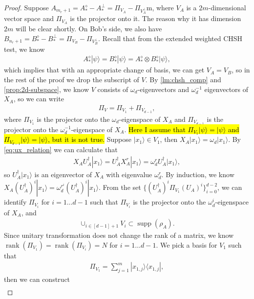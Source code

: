 \documentclass[11pt,letterpaper]{article}
\newcommand{\ket}[1]{|#1\rangle}
\newcommand{\ketbra}[2]{|#1\rangle\langle#2|}
\newcommand{\x}{\otimes}
\DeclareMathOperator{\rank}{rank}
\DeclareMathOperator{\supp}{supp}
\newcommand{\1}{\mathbb{1}}
\theoremstyle{definition}
\begin{document}
\begin{proof}
Suppose $A_{m_r+1} = A_\ast^\diamond- A_\ast^\perp = \Pi_{V_A} - \Pi_{V_A^\perp}$m, where $V_A$ is a
$2m$-dimensional vector space and $\Pi_{V_A}$ is the projector onto it. The reason why it has dimension $2m$
will be clear shortly. On Bob's side, we also have $B_{n_r+1} = B_\ast^\diamond- B_\ast^\perp = \Pi_{V_B} - \Pi_{V_B^\perp}$.
Recall that from the extended weighted CHSH test, we know
\begin{align}
	A_\ast^\diamond \ket{\psi} = B_\ast^\diamond \ket{\psi} = A_\ast^\diamond \x B_\ast^\diamond \ket{\psi},
\end{align}
which implies that with an appropriate change of basis, we can get $V_A = V_B$, so in the rest of the proof
we drop the subscript of $V$.
By \cref{lm:chsh_comp} and \cref{prop:2d-subspace}, we know $V$ consists of $\omega_d$-eigenvectors and $\omega_d^{-1}$ eigenvectors of 
$X_A$, so we can write 
\begin{align}
	\Pi_{V} = \Pi_{V_1} + \Pi_{V_{d-1}},
\end{align}
where $\Pi_{V_{1}}$ is the projector onto the $\omega_d$-eigenspace of $X_A$ and $\Pi_{V_{d-1}}$ is the projector 
onto the $\omega_d^{-1}$-eigenspace of $X_A$.
\hl{Here I assume that $\Pi_{V_1} \ket{\psi} = \ket{\psi}$ and $\Pi_{V_{d-1}} \ket{\psi} = \ket{\psi}$,
but it is not true.}
Suppose $\ket{x_{1}} \in V_{1}$, then $X_A \ket{x_{1}} = \omega_d \ket{x_{1}}$.
By \cref{eq:ux_relation} we can calculate that
\begin{align}
\label{eq:ladder}
 X_AU_A^\dagger \ket{x_{1}} = U_A^\dagger X_A^r \ket{x_{1}} = \omega_d^r U_A^\dagger \ket{x_{1}},
\end{align}
so $U_A^\dagger \ket{x_{1}}$ is an eigenvector of $X_A$ with eigenvalue $\omega_d^r$.
By induction, we know $X_A (U_A^\dagger)^i \ket{x_{1}} = \omega_d^{r^i} (U_A^\dagger)^i\ket{x_{1}}$. 
From the set $\{(U_A^\dagger)^i \Pi_{V_1} (U_A)^i \}_{i=0}^{d-2}$, we can identify $\Pi_{V_i}$ for $i = 1 \dots  d-1$
such that $\Pi_{V_i}$ is the projector onto the $\omega_d^i$-eigenspace of $X_A$,
and 
\begin{align}
 \cup_{i \in [d-1]+1} V_i \subset \supp(\rho_A).
\end{align}
Since unitary transformation does not change the rank of a matrix, we know $\rank(\Pi_{V_1}) = \rank(\Pi_{V_{i}}) =N$
for $ i =1 \dots d-1$.
We pick a basis for $V_1$ such that 
\begin{align}
	\Pi_{V_1} =  \sum_{j=1}^m \ketbra{x_{1,j}}{x_{1,j}},
\end{align}
then we can construct 
\begin{align}

\end{align}
\end{proof}
\end{document}
